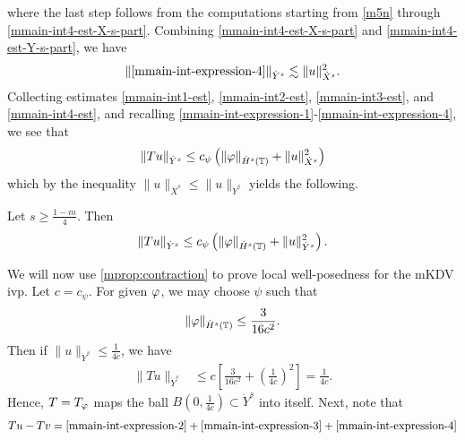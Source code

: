 %
%
where the last step follows from the computations starting from \eqref{m5n}
through \eqref{mmain-int4-est-X-s-part}.
Combining \eqref{mmain-int4-est-X-s-part} and \eqref{mmain-int4-est-Y-s-part}, we
have
%
%
\begin{equation}
\label{mmain-int4-est}
	\begin{split}
		\|\eqref{mmain-int-expression-4}\|_{\dot{Y}^s} \lesssim \|u\|_{\dot{X}^s}^2.
	\end{split}
\end{equation}
%
%
Collecting estimates \eqref{mmain-int1-est}, \eqref{mmain-int2-est}, 
\eqref{mmain-int3-est}, and \eqref{mmain-int4-est}, and recalling 
\eqref{mmain-int-expression-1}-\eqref{mmain-int-expression-4}, we see that
$$\|Tu\|_{\dot{Y}^s} \le c_\psi \left( \|\varphi \|_{\dot{H}^s(\mathbb{T})} + \|u\|_{\dot{X}^s}^2 \right )$$ 
which by the inequality $\|u\|_{\dot{X}^s} \le \|u\|_{\dot{Y}^s}$ yields the following.
%
%				 
%
\begin{proposition}
\label{mprop:contraction}
Let $s \ge \frac{1-m}{4}$. Then
%
\begin{equation*}
	\begin{split}
		\|Tu\|_{\dot{Y}^s} \le c_\psi \left( \|\varphi \|_{\dot{H}^s(\mathbb{T})} + \|u\|_{\dot{Y}^s}^2 
		\right).
	\end{split}
\end{equation*}
%
\end{proposition}
We will now use \cref{mprop:contraction} to prove local well-posedness for the 
mKDV ivp. Let $c = c_{\psi}$. For given $\varphi$, we may choose $\psi$ such
that 
%
\begin{equation*}
	\begin{split}
		\|\varphi\|_{\dot{H}^s(\mathbb{T})} \le \frac{3}{16c^2}.
	\end{split}
\end{equation*}
%
Then if $\|u\|_{\dot{Y}^s} \le \frac{1}{4c}$, we have
%
\begin{equation*}
	\begin{split}
		\|T u \|_{\dot{Y}^s} 
		& \le c \left[ \frac{3}{16c^2} + \left( 
		\frac{1}{4c} \right)^2 \right]
		=  \frac{1}{4c}.
	\end{split}
\end{equation*}
%
Hence, $T=T_{\varphi}$ maps the ball $B\left( 0, \frac{1}{4c} \right) \subset \dot{Y}^s$ into 
itself. Next, note that
%
\begin{equation*}
	\begin{split}
		Tu - Tv = \eqref{mmain-int-expression-2} + \eqref{mmain-int-expression-3} 
		+ \eqref{mmain-int-expression-4}
	\end{split}
\end{equation*}
